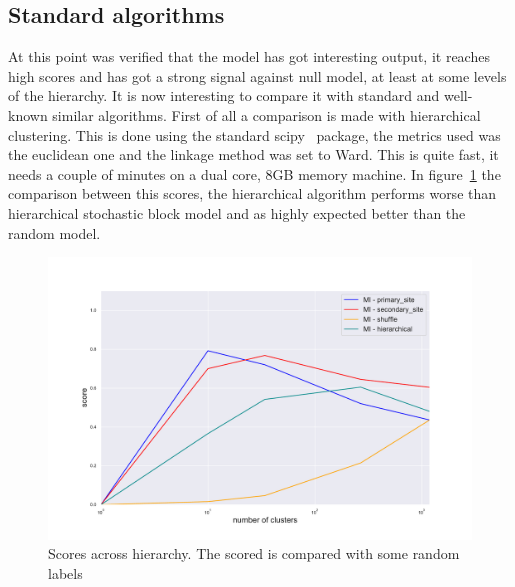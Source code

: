 \subsection{Standard algorithms}
At this point was verified that the model has got interesting output, it reaches high scores and has got a strong signal against null model, at least at some levels of the hierarchy. It is now interesting to compare it with standard and well-known similar algorithms.
First of all a comparison is made with hierarchical clustering. This is done using the standard scipy~\cite{jones2014scipy} package, the metrics used was the euclidean one and the linkage method was set to Ward. This is quite fast, it needs a couple of minutes on a dual core, 8GB memory machine.
In figure~\ref{fig:topic/gtex/oversigma_10tissue/metric_scores_hier} the comparison between this scores, the hierarchical algorithm performs worse than hierarchical stochastic block model and as highly expected better than the random model.
\begin{figure}[htb!]
    \centering
    \includegraphics[width=0.9\linewidth]{pictures/topic/gtex/oversigma_10tissue/metric_scores_hier.pdf}
    \caption{Scores across hierarchy. The scored is compared with some random labels}
    \label{fig:topic/gtex/oversigma_10tissue/metric_scores_hier}
\end{figure}

